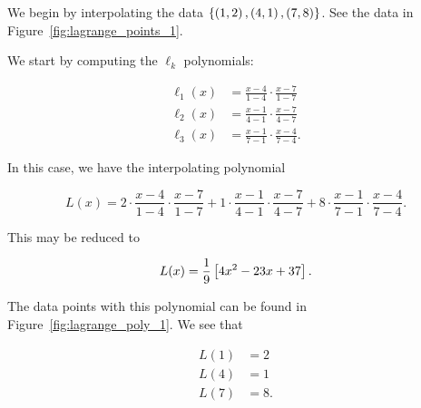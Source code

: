 \begin{example}
\label{example:math_lagrange_reals_1}

We begin by interpolating the data
$\left\{ \left( 1,2 \right),\left( 4,1 \right),\left( 7,8 \right) \right\}$.
See the data in Figure~\ref{fig:lagrange_points_1}.



We start by computing the $\ell_{k}$ polynomials:

\begin{align}
    \ell_{1}(x) &= \frac{x-4}{1-4}\cdot\frac{x-7}{1-7}
        \nonumber\\
    \ell_{2}(x) &= \frac{x-1}{4-1}\cdot\frac{x-7}{4-7}
        \nonumber\\
    \ell_{3}(x) &= \frac{x-1}{7-1}\cdot\frac{x-4}{7-4}.
\end{align}

\noindent
In this case, we have the interpolating polynomial

\begin{equation}
    L(x) = 2\cdot\frac{x-4}{1-4}\cdot\frac{x-7}{1-7}
        + 1\cdot\frac{x-1}{4-1}\cdot\frac{x-7}{4-7}
        + 8\cdot\frac{x-1}{7-1}\cdot\frac{x-4}{7-4}.
\end{equation}

\noindent
This may be reduced to

\begin{equation}
    L(x) = \frac{1}{9}\left[ 4x^{2} - 23x + 37 \right].
\end{equation}

\noindent
The data points with this polynomial can be found in
Figure~\ref{fig:lagrange_poly_1}.
We see that

\begin{align}
    L(1) &= 2 \nonumber\\
    L(4) &= 1 \nonumber\\
    L(7) &= 8.
\end{align}
\end{example}

